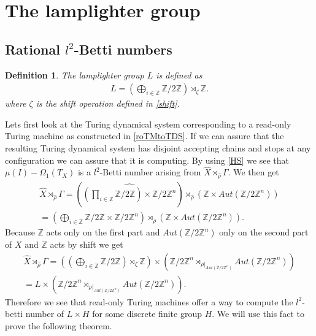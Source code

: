 \documentclass[12pt,a4paper]{scrartcl}
\newtheorem{Definition}[Theorem]{Definition}
\numberwithin{equation}{section}
\newcommand{\Z}{\mathbb{Z}} %
\newcommand{\2}{\mathbb{Z} / 2 \mathbb{Z}}
\newcommand{\1}{\bar{1}}
\newcommand{\0}{\bar{0}}
\begin{document}
\section{The lamplighter group}
\subsection{Rational $l^2$-Betti numbers}
\begin{Definition}
	The lamplighter group $L$ is defined as
	\begin{align*}
		L = (\bigoplus_{i \in \Z} \2) \rtimes_{\zeta} \Z.
	\end{align*}
	where $\zeta$ is the shift operation defined in \ref{shift}.
\end{Definition}
Lets first look at the Turing dynamical system corresponding to a read-only Turing machine as constructed in \ref{roTMtoTDS}. If we can assure that the resulting Turing dynamical system has disjoint accepting chains and stops at any configuration we can assure that it is computing. By using \ref{HS} we see that $\mu (I) - \Omega_1(T_X)$ is a $l^2$-Betti number arising from $\hat{X} \rtimes_{\hat{\rho}} \Gamma$. We then get
\begin{align*}
	\hat{X} \rtimes_{\hat{\rho}} \Gamma = (\widehat{(\prod_{i \in \Z} \2) \times \2^n}) \rtimes_{\hat{\rho}} (\Z \times Aut(\2^n)) \\
	= (\bigoplus_{i \in \Z} \2 \times \2^n) \rtimes_{\rho} (\Z \times Aut(\2^n)).
\end{align*}
Because $\Z$ acts only on the first part and $Aut(\2^n)$ only on the second part of $X$ and $\Z$ acts by shift we get
\begin{align*}
	\hat{X} \rtimes_{\hat{\rho}} \Gamma = ((\bigoplus_{i \in \Z} \2) \rtimes_{\zeta} \Z) \times (\2^n \rtimes_{\rho|_{Aut(\2^n)}} Aut(\2^n)) \\
	= L \times (\2^n \rtimes_{\rho|_{Aut(\2^n)}} Aut(\2^n)).
\end{align*}
Therefore we see that read-only Turing machines offer a way to compute the $l^2$-betti number of $L \times H$ for some discrete finite group $H$. We will use this fact to prove the following theorem.
\end{document}
